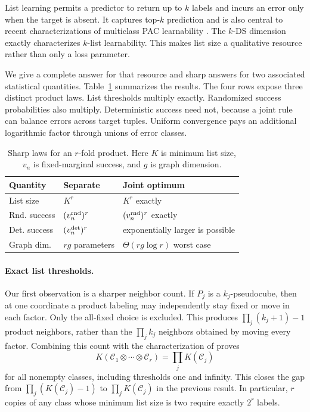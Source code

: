 \documentclass[twoside]{article}
\newcommand{\cC}{\mathcal C}
\newcommand{\ot}{\mathbin\otimes}
\begin{document}
List learning permits a predictor to return up to $k$ labels and incurs an error only when the target is absent. It captures top-$k$ prediction and is also central to recent characterizations of multiclass PAC learnability \citep{brukhim2022,charikar2023}. The $k$-DS dimension exactly characterizes $k$-list learnability. This makes list size a qualitative resource rather than only a loss parameter.

We give a complete answer for that resource and sharp answers for two associated statistical quantities. Table~\ref{tab:summary} summarizes the results. The four rows expose three distinct product laws. List thresholds multiply exactly. Randomized success probabilities also multiply. Deterministic success need not, because a joint rule can balance errors across target tuples. Uniform convergence pays an additional logarithmic factor through unions of error classes.

\begin{table}[t]
\centering
\caption{Sharp laws for an $r$-fold product. Here $K$ is minimum list size, $v_n$ is fixed-marginal success, and $g$ is graph dimension.}
\label{tab:summary}
\scriptsize
\begin{tabular}{@{}p{}p{}p{}@{}}
\toprule
Quantity & Separate & Joint optimum \\
\midrule
List size & $K^r$ & $K^r$ exactly \\
Rnd. success & $(v_n^{\rm rnd})^r$ & $(v_n^{\rm rnd})^r$ exactly \\
Det. success & $(v_n^{\rm det})^r$ & exponentially larger is possible \\
Graph dim. & $rg$ parameters & $\Theta(rg\log r)$ worst case \\
\bottomrule
\end{tabular}
\end{table}

\paragraph{Exact list thresholds.} Our first observation is a sharper neighbor count. If $P_j$ is a $k_j$-pseudocube, then at one coordinate a product labeling may independently stay fixed or move in each factor. Only the all-fixed choice is excluded. This produces $\prod_j(k_j+1)-1$ product neighbors, rather than the $\prod_j k_j$ neighbors obtained by moving every factor. Combining this count with the characterization of \citet{charikar2023} proves
\[ K(\cC_1\ot\cdots\ot\cC_r)=\prod_jK(\cC_j) \] for all nonempty classes, including thresholds one and infinity. This closes the gap from $\prod_j(K(\cC_j)-1)$ to $\prod_jK(\cC_j)$ in the previous result. In particular, $r$ copies of any class whose minimum list size is two require exactly $2^r$ labels.
\end{document}
